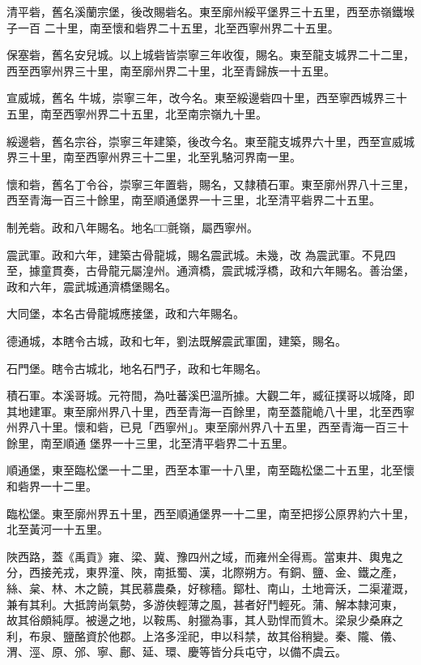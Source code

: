 \begin{pinyinscope}
 清平砦，舊名溪蘭宗堡，後改賜砦名。東至廓州綏平堡界三十五里，西至赤嶺鐵堠子一百
 二十里，南至懷和砦界二十五里，北至西寧州界二十五里。



 保塞砦，舊名安兒城。以上城砦皆崇寧三年收復，賜名。東至龍支城界二十二里，西至西寧州界三十里，南至廓州界二十里，北至青歸族一十五里。


宣威城，舊名
 牛城，崇寧三年，改今名。東至綏邊砦四十里，西至寧西城界三十五里，南至西寧州界二十五里，北至南宗嶺九十里。



 綏邊砦，舊名宗谷，崇寧三年建築，後改今名。東至龍支城界六十里，西至宣威城界三十里，南至西寧州界三十二里，北至乳駱河界南一里。



 懷和砦，舊名丁令谷，崇寧三年置砦，賜名，又隸積石軍。東至廓州界八十三里，西至青海一百三十餘里，南至順通堡界一十三里，北至清平砦界二十五里。



 制羌砦。政和八年賜名。地名□□氈嶺，屬西寧州。



 震武軍。政和六年，建築古骨龍城，賜名震武城。未幾，改
 為震武軍。不見四至，據童貫奏，古骨龍元屬湟州。通濟橋，震武城浮橋，政和六年賜名。善治堡，政和六年，震武城通濟橋堡賜名。



 大同堡，本名古骨龍城應接堡，政和六年賜名。



 德通城，本瞎令古城，政和七年，劉法既解震武軍圍，建築，賜名。



 石門堡。瞎令古城北，地名石門子，政和七年賜名。



 積石軍。本溪哥城。元符間，為吐蕃溪巴溫所據。大觀二年，臧征撲哥以城降，即其地建軍。東至廓州界八十里，西至青海一百餘里，南至蓋龍峗八十里，北至西寧州界八十里。懷和砦，已見「西寧州」。東至廓州界八十五里，西至青海一百三十餘里，南至順通
 堡界一十三里，北至清平砦界二十五里。



 順通堡，東至臨松堡一十二里，西至本軍一十八里，南至臨松堡二十五里，北至懷和砦界一十二里。



 臨松堡。東至廓州界五十里，西至順通堡界一十二里，南至把拶公原界約六十里，北至黃河一十五里。



 陜西路，蓋《禹貢》雍、梁、冀、豫四州之域，而雍州全得焉。當東井、輿鬼之分，西接羌戎，東界潼、陜，南抵蜀、漢，北際朔方。有銅、鹽、金、鐵之產，絲、枲、林、木之饒，其民慕農桑，好稼穡。鄮杜、南山，土地膏沃，二渠灌溉，兼有其利。大抵誇尚氣勢，多游俠輕薄之風，甚者好鬥輕死。蒲、解本隸河東，
 故其俗頗純厚。被邊之地，以鞍馬、射獵為事，其人勁悍而質木。梁泉少桑麻之利，布泉、鹽酪資於他郡。上洛多淫祀，申以科禁，故其俗稍變。秦、隴、儀、渭、涇、原、邠、寧、鄜、延、環、慶等皆分兵屯守，以備不虞云。



\end{pinyinscope}